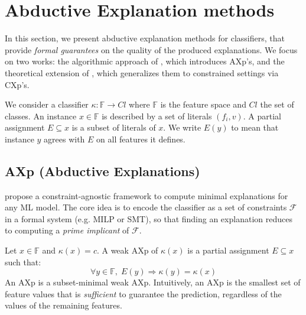 
\section{Abductive Explanation methods}


In this section, we present abductive explanation methods for classifiers, that provide \emph{formal guarantees}
on the quality of the produced explanations. We focus on two works: the
algorithmic approach of \textcite{ignatiev_abduction-based_2019}, which
introduces AXp's, and the theoretical extension of \textcite{cooper_abductive_2024}, 
which generalizes them to constrained settings via CXp's.

\begin{remark}[Notation]
    We consider a classifier $\kappa : \mathbb{F} \to Cl$
    where $\mathbb{F}$ is the feature space and $Cl$ the set of classes. An instance
    $x \in \mathbb{F}$ is described by a set of literals $(f_i, v)$. A partial assignment
    $E \subseteq x$ is a subset of literals of $x$. We write $E(y)$ to mean that
    instance $y$ agrees with $E$ on all features it defines.
\end{remark} 

\subsection{AXp (Abductive Explanations)}

\textcite{ignatiev_abduction-based_2019} propose a constraint-agnostic framework to compute minimal 
explanations for any ML model. The core idea is to encode the classifier as a set of constraints $\mathcal{F}$ 
in a formal system (e.g. MILP or SMT), so that finding an explanation reduces to computing a
\emph{prime implicant} of $\mathcal{F}$.

\begin{definition}[AXp]
    Let $x \in \mathbb{F}$ and $\kappa(x) = c$.
    A weak AXp of $\kappa(x)$ is a partial assignment $E \subseteq x$ such that:
    $$\forall y \in \mathbb{F},\; E(y) \Rightarrow \kappa(y) = \kappa(x)$$
    An AXp is a subset-minimal weak AXp. Intuitively, an AXp is the smallest set of
    feature values that is \emph{sufficient} to guarantee the prediction, regardless
    of the values of the remaining features.
\end{definition} 

